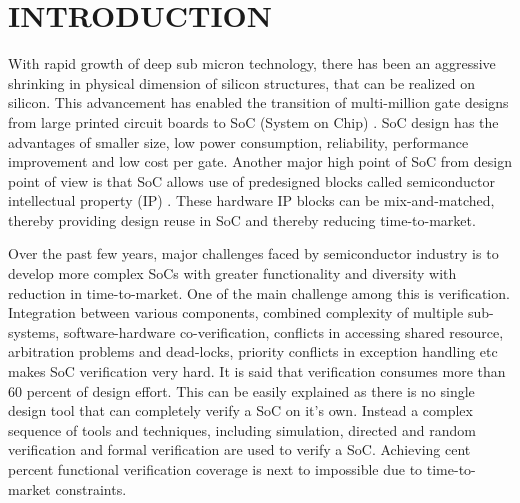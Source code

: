 \chapter{INTRODUCTION}

With rapid growth of deep sub micron technology, there has been an aggressive shrinking in physical dimension of silicon structures, that can be realized on silicon. This advancement has enabled the transition of multi-million gate designs from large printed circuit boards to SoC (System on Chip) . SoC design has the advantages of smaller size, low power consumption, reliability, performance improvement and low cost per gate. Another major high point of SoC from design point of view is that SoC allows use of predesigned blocks called semiconductor intellectual property (IP) . These hardware IP blocks can be mix-and-matched, thereby providing design reuse in SoC and thereby reducing time-to-market. 


 Over the past few years, major challenges faced by semiconductor industry is to develop more complex SoCs with greater functionality and diversity with reduction in time-to-market. One of the main challenge among this is verification. Integration between various components, combined complexity of multiple sub-systems, software-hardware co-verification, conflicts in accessing shared resource, arbitration problems and dead-locks, priority conflicts in exception handling etc makes SoC verification very hard. It is said that verification consumes more than 60 percent of design effort. This can be easily explained as there is no single design tool that can completely verify a SoC on it's own. Instead a complex sequence of tools and techniques, including simulation, directed and random verification and formal verification are used to verify a SoC. Achieving cent percent functional verification coverage is next to impossible due to time-to-market constraints.


